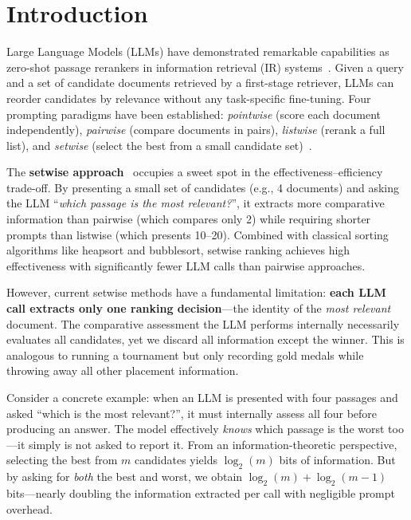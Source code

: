 \section{Introduction}
\label{sec:intro}

Large Language Models (LLMs) have demonstrated remarkable capabilities as zero-shot passage rerankers in information retrieval (IR) systems~\citep{sun2023chatgpt, qin2024large, zhuang2024setwise}. Given a query and a set of candidate documents retrieved by a first-stage retriever, LLMs can reorder candidates by relevance without any task-specific fine-tuning. Four prompting paradigms have been established: \emph{pointwise} (score each document independently), \emph{pairwise} (compare documents in pairs), \emph{listwise} (rerank a full list), and \emph{setwise} (select the best from a small candidate set)~\citep{zhuang2024setwise}.

The \textbf{setwise approach}~\citep{zhuang2024setwise} occupies a sweet spot in the effectiveness--efficiency trade-off. By presenting a small set of candidates (e.g., 4 documents) and asking the LLM ``\emph{which passage is the most relevant?}'', it extracts more comparative information than pairwise (which compares only 2) while requiring shorter prompts than listwise (which presents 10--20). Combined with classical sorting algorithms like heapsort and bubblesort, setwise ranking achieves high effectiveness with significantly fewer LLM calls than pairwise approaches.

However, current setwise methods have a fundamental limitation: \textbf{each LLM call extracts only one ranking decision}---the identity of the \emph{most relevant} document. The comparative assessment the LLM performs internally necessarily evaluates all candidates, yet we discard all information except the winner. This is analogous to running a tournament but only recording gold medals while throwing away all other placement information.

Consider a concrete example: when an LLM is presented with four passages and asked ``which is the most relevant?'', it must internally assess all four before producing an answer. The model effectively \emph{knows} which passage is the worst too---it simply is not asked to report it. From an information-theoretic perspective, selecting the best from $m$ candidates yields $\log_2(m)$ bits of information. But by asking for \emph{both} the best and worst, we obtain $\log_2(m) + \log_2(m-1)$ bits---nearly doubling the information extracted per call with negligible prompt overhead.

